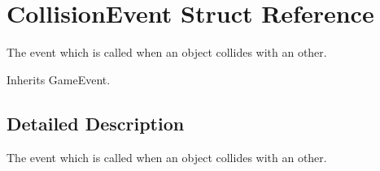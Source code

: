 \hypertarget{struct_collision_event}{\section{Collision\-Event Struct Reference}
\label{struct_collision_event}
}


The event which is called when an object collides with an other.  




Inherits Game\-Event.



\subsection{Detailed Description}
The event which is called when an object collides with an other. 

